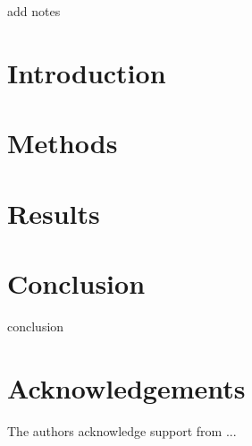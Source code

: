 \documentclass[]{cas-sc}
\begin{document}
add notes

\section{Introduction}
\section{Methods}
\section{Results}
\section{Conclusion}\label{section:conclusion}

conclusion

\section{Acknowledgements}

The authors acknowledge support from  ...

\FloatBarrier
\printbibliography
%
\end{document}
